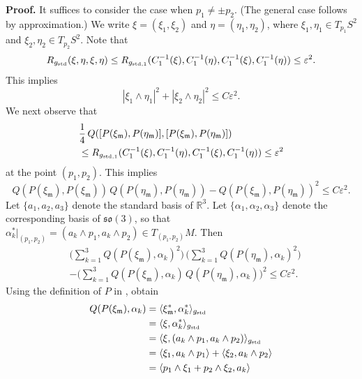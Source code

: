 \documentclass[11pt]{amsart}
\theoremstyle{definition}
\begin{document}
\textbf{Proof.} 
It suffices to consider the case when $p_1 \neq \pm p_2$. (The general case follows by approximation.) We write $\xi = (\xi_1,\xi_2)$ and $\eta = (\eta_1,\eta_2)$, where $\xi_1,\eta_1 \in T_{p_1} S^2$ and $\xi_2,\eta_2 \in T_{p_2} S^2$. Note that 
\[R_{g_{\text{\rm std}}}(\xi,\eta,\xi,\eta) \leq R_{g_{\text{\rm std},1}}(C_1^{-1}(\xi),C_1^{-1}(\eta),C_1^{-1}(\xi),C_1^{-1}(\eta)) \leq \varepsilon^2.\] 
This implies 
\begin{equation}
\label{a}
|\xi_1 \wedge \eta_1|^2 + |\xi_2 \wedge \eta_2|^2 \leq C\varepsilon^2. 
\end{equation}
We next observe that 
\begin{align*} 
&\frac{1}{4} \, Q([P(\xi_{\mathfrak{m}}),P(\eta_{\mathfrak{m}})],[P(\xi_{\mathfrak{m}}),P(\eta_{\mathfrak{m}})]) \\ 
&\leq R_{g_{\text{\rm std},1}}(C_1^{-1}(\xi),C_1^{-1}(\eta),C_1^{-1}(\xi),C_1^{-1}(\eta)) \leq \varepsilon^2 
\end{align*}
at the point $(p_1,p_2)$. This implies 
\[Q(P(\xi_{\mathfrak{m}}),P(\xi_{\mathfrak{m}})) \, Q(P(\eta_{\mathfrak{m}}),P(\eta_{\mathfrak{m}})) - Q(P(\xi_{\mathfrak{m}}),P(\eta_{\mathfrak{m}}))^2 \leq C\varepsilon^2.\] 
Let $\{a_1,a_2,a_3\}$ denote the standard basis of $\mathbb{R}^3$. Let $\{\alpha_1,\alpha_2,\alpha_3\}$ denote the corresponding basis of $\mathfrak{so}(3)$, so that $\alpha_k^*|_{(p_1,p_2)} = (a_k \wedge p_1,a_k \wedge p_2) \in T_{(p_1,p_2)} M$. Then 
\begin{align*} 
&\Big ( \sum_{k=1}^3 Q(P(\xi_{\mathfrak{m}}),\alpha_k)^2 \Big ) \, \Big ( \sum_{k=1}^3 Q(P(\eta_{\mathfrak{m}}),\alpha_k)^2 \Big ) \\ 
&- \Big ( \sum_{k=1}^3 Q(P(\xi_{\mathfrak{m}}),\alpha_k) \, Q(P(\eta_{\mathfrak{m}}),\alpha_k) \Big )^2 \leq C\varepsilon^2. 
\end{align*}
Using the definition of $P$ in \cite{Ziller}, obtain 
\begin{align*} 
Q(P(\xi_{\mathfrak{m}}),\alpha_k) 
&= \langle \xi_{\mathfrak{m}}^*,\alpha_k^* \rangle_{g_{\text{\rm std}}} \\ 
&= \langle \xi,\alpha_k^* \rangle_{g_{\text{\rm std}}} \\ 
&= \langle \xi,(a_k \wedge p_1,a_k \wedge p_2) \rangle_{g_{\text{\rm std}}} \\ 
&= \langle \xi_1,a_k \wedge p_1 \rangle + \langle \xi_2,a_k \wedge p_2 \rangle \\ 
&= \langle p_1 \wedge \xi_1 + p_2 \wedge \xi_2,a_k \rangle 
\end{align*}
\end{document}
